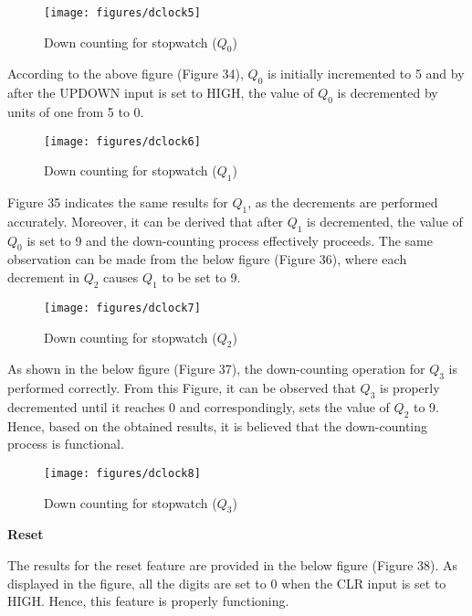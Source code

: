 \documentclass[12pt,a4paper]{article}
\begin{document}
	\begin{figure}[H]
		\centering
		\texttt{[image: figures/dclock5]}
		\caption{Down counting for stopwatch ($Q_{0}$)}
	\end{figure}
	
	\noindent According to the above figure (Figure 34), $Q_{0}$ is initially incremented to 5 and by after the UPDOWN input is set to HIGH, the value of $Q_{0}$ is decremented by units of one from 5 to 0.
	
	\begin{figure}[H]
		\centering
		\texttt{[image: figures/dclock6]}
		\caption{Down counting for stopwatch ($Q_{1}$)}
	\end{figure}
	
	\noindent Figure 35 indicates the same results for $Q_{1}$, as the decrements are performed accurately. Moreover, it can be derived that after $Q_{1}$ is decremented, the value of $Q_{0}$ is set to 9 and the down-counting process effectively proceeds. The same observation can be made from the below figure (Figure 36), where each decrement in $Q_{2}$ causes $Q_{1}$ to be set to 9. 
	
	\begin{figure}[H]
		\centering
		\texttt{[image: figures/dclock7]}
		\caption{Down counting for stopwatch ($Q_{2}$)}
	\end{figure}
	
	\noindent As shown in the below figure (Figure 37), the down-counting operation for $Q_{3}$ is performed correctly. From this Figure, it can be observed that $Q_{3}$ is properly decremented until it reaches 0 and correspondingly, sets the value of $Q_{2}$ to 9. Hence, based on the obtained results, it is believed that the down-counting process is functional.
	
	\begin{figure}[H]
		\centering
		\texttt{[image: figures/dclock8]}
		\caption{Down counting for stopwatch ($Q_{3}$)}
	\end{figure}
	
	\noindent 
	
	\noindent \textbf{Reset}
	\vspace{0.2cm}
	
	\noindent The results for the reset feature are provided in the below figure (Figure 38). As displayed in the figure, all the digits are set to 0 when the CLR input is set to HIGH. Hence, this feature is properly functioning.
	
\end{document}
